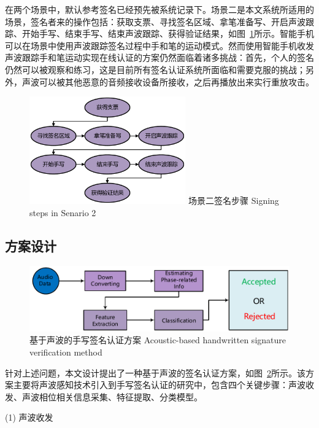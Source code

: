 在两个场景中，默认参考签名已经预先被系统记录下。场景二是本文系统所适用的场景，签名者来的操作包括：获取支票、寻找签名区域、拿笔准备写、开启声波跟踪、开始手写、结束手写、结束声波跟踪、获得验证结果，如图~\ref{fig:signing-steps}所示。智能手机可以在场景中使用声波跟踪签名过程中手和笔的运动模式。然而使用智能手机收发声波跟踪手和笔运动实现在线认证的方案仍然面临着诸多挑战：首先，个人的签名仍然可以被观察和练习，这是目前所有签名认证系统所面临和需要克服的挑战；另外，声波可以被其他恶意的音频接收设备所接收，之后再播放出来实行重放攻击。
\begin{figure}[!htp]
  \centering
  \includegraphics[width=0.6\textwidth]{figure/senario-actions}
  \bicaption
    {场景二签名步骤}
    {Signing steps in Senario 2}
  \label{fig:signing-steps}
\end{figure}

\subsection{方案设计}
\begin{figure}[!htp]
  \centering
  \includegraphics[width=\textwidth]{figure/system-architecture.pdf}
  \bicaption
    {基于声波的手写签名认证方案}
    {Acoustic-based handwritten signature verification method}
  \label{fig:acoustic-hsv-method}
\end{figure}
针对上述问题，本文设计提出了一种基于声波的签名认证方案，如图~\ref{fig:acoustic-hsv-method}所示。该方案主要将声波感知技术引入到手写签名认证的研究中，包含四个关键步骤：声波收发、声波相位相关信息采集、特征提取、分类模型。

(1) 声波收发

